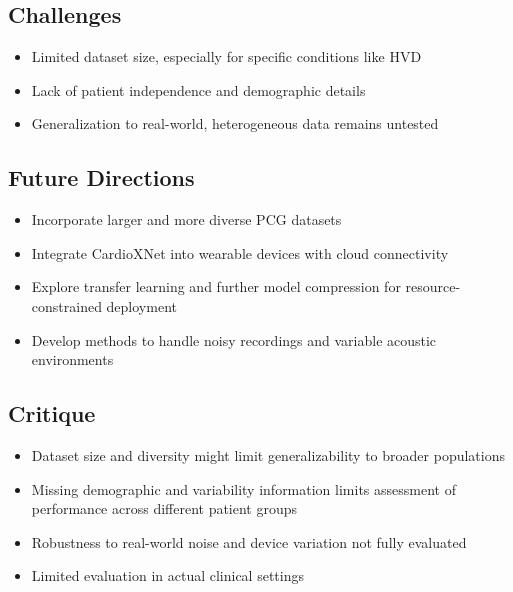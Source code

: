 \subsection*{Challenges}
\begin{itemize}
    \item Limited dataset size, especially for specific conditions like HVD
    \item Lack of patient independence and demographic details
    \item Generalization to real-world, heterogeneous data remains untested
\end{itemize}

\subsection*{Future Directions}
\begin{itemize}
    \item Incorporate larger and more diverse PCG datasets
    \item Integrate CardioXNet into wearable devices with cloud connectivity
    \item Explore transfer learning and further model compression for resource-constrained deployment
    \item Develop methods to handle noisy recordings and variable acoustic environments
\end{itemize}

\subsection*{Critique}
\begin{itemize}
    \item Dataset size and diversity might limit generalizability to broader populations
    \item Missing demographic and variability information limits assessment of performance across different patient groups
    \item Robustness to real-world noise and device variation not fully evaluated
    \item Limited evaluation in actual clinical settings
\end{itemize}


